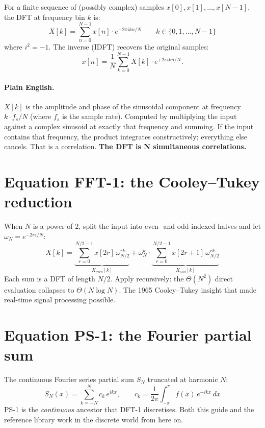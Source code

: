 \documentclass[11pt,a4paper,openany]{book}
\newcommand{\eqdft}{\tag{DFT-1}}
\newcommand{\eqidft}{\tag{DFT-2}}
\newcommand{\eqfft}{\tag{FFT-1}}
\newcommand{\eqps}{\tag{PS-1}}
\begin{document}
For a finite sequence of (possibly complex) samples
$x[0], x[1], \ldots, x[N-1]$, the DFT at frequency bin $k$ is:
\begin{equation}
X[k] = \sum_{n=0}^{N-1} x[n] \cdot e^{-2\pi i k n / N}
\qquad k \in \{0, 1, \ldots, N-1\}
\eqdft
\end{equation}
where $i^2 = -1$. The inverse (IDFT) recovers the original samples:
\begin{equation}
x[n] = \frac{1}{N} \sum_{k=0}^{N-1} X[k] \cdot e^{+2\pi i k n / N}.
\eqidft
\end{equation}

\paragraph{Plain English.} $X[k]$ is the amplitude and phase of the
sinusoidal component at frequency $k \cdot f_s / N$ (where $f_s$ is
the sample rate). Computed by multiplying the input against a complex
sinusoid at exactly that frequency and summing. If the input contains
that frequency, the product integrates constructively; everything else
cancels. That is a correlation. \textbf{The DFT is N simultaneous
correlations.}

\section{Equation FFT-1: the Cooley--Tukey reduction}

When $N$ is a power of $2$, split the input into even- and odd-indexed
halves and let $\omega_N = e^{-2\pi i / N}$:
\begin{equation}
X[k] = \underbrace{\sum_{r=0}^{N/2-1} x[2r]\,\omega_{N/2}^{rk}}_{X_{\mathrm{even}}[k]}
+ \omega_N^{k} \cdot \underbrace{\sum_{r=0}^{N/2-1} x[2r+1]\,\omega_{N/2}^{rk}}_{X_{\mathrm{odd}}[k]}
\eqfft
\end{equation}
Each sum is a DFT of length $N/2$. Apply recursively: the $\Theta(N^2)$
direct evaluation collapses to $\Theta(N \log N)$. The 1965
Cooley--Tukey insight \cite{Cooley1965} that made real-time signal
processing possible.

\section{Equation PS-1: the Fourier partial sum}

The continuous Fourier series partial sum $S_N$ truncated at harmonic
$N$:
\begin{equation}
S_N(x) = \sum_{k=-N}^{N} c_k\, e^{ikx},
\qquad
c_k = \frac{1}{2\pi}\int_{-\pi}^{\pi} f(x)\, e^{-ikx}\,dx
\eqps
\end{equation}
PS-1 is the \emph{continuous} ancestor that DFT-1 discretises. Both
this guide and the reference library work in the discrete world from
here on.
\end{document}

